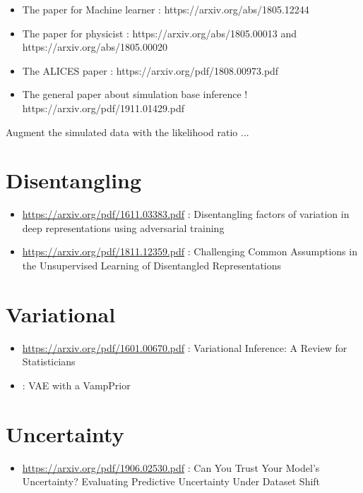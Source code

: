 \begin{itemize}
	\item The paper for Machine learner  : https://arxiv.org/abs/1805.12244
	\item The paper for physicist : https://arxiv.org/abs/1805.00013 and https://arxiv.org/abs/1805.00020
	\item The ALICES paper : https://arxiv.org/pdf/1808.00973.pdf
    \item The general paper about simulation base inference ! https://arxiv.org/pdf/1911.01429.pdf
\end{itemize}

Augment the simulated data with the likelihood ratio ...





\section{Disentangling} %
\label{sec:disentangling}


\begin{itemize}
    \item \url{https://arxiv.org/pdf/1611.03383.pdf} : Disentangling factors of variation in deep representations using adversarial training
    \item \url{https://arxiv.org/pdf/1811.12359.pdf} : Challenging Common Assumptions in the Unsupervised Learning of Disentangled Representations
\end{itemize}



\section{Variational} %
\label{sec:variational}

\begin{itemize}
    \item \url{https://arxiv.org/pdf/1601.00670.pdf} : Variational Inference: A Review for Statisticians
    \item \url{} : VAE with a VampPrior
\end{itemize}


\section{Uncertainty} %
\label{sec:uncertainty}

\begin{itemize}
    \item \url{https://arxiv.org/pdf/1906.02530.pdf} : Can You Trust Your Model's Uncertainty? Evaluating Predictive Uncertainty Under Dataset Shift
\end{itemize}




